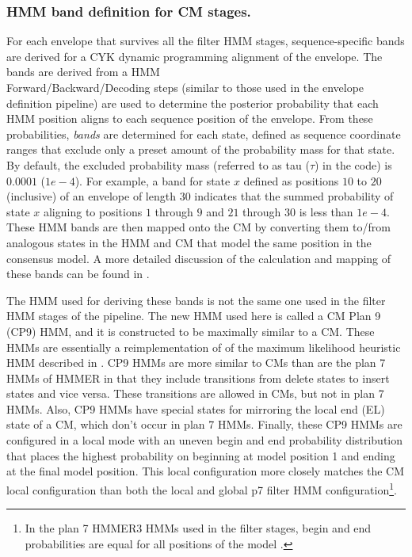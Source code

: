 \subsubsection{HMM band definition for CM stages.}

For each envelope that survives all the filter HMM stages,
sequence-specific bands are derived for a CYK dynamic programming
alignment of the envelope. The bands are derived from a HMM \\
Forward/Backward/Decoding steps (similar to those used in the envelope
definition pipeline) are used to determine the posterior probability
that each HMM position aligns to each sequence position of the
envelope. From these probabilities, \emph{bands} are determined for
each state, defined as sequence coordinate ranges that exclude only a
preset amount of the probability mass for that state. By default, the
excluded probability mass (referred to as tau ($\tau$) in the code) is
$0.0001$ ($1e-4$). For example, a band for state $x$ defined as
positions $10$ to $20$ (inclusive) of an envelope of length $30$
indicates that the summed probability of state $x$ aligning to
positions $1$ through $9$ and $21$ through $30$ is less than
$1e-4$. These HMM bands are then mapped onto the CM by converting them
to/from analogous states in the HMM and CM that model the same
position in the consensus model. A more detailed discussion of the
calculation and mapping of these bands can be found in
\citep{Nawrocki09b}.

The HMM used for deriving these bands is not the same one used in the
filter HMM stages of the pipeline. The new HMM used here is called a
CM Plan 9 (CP9) HMM, and it is constructed to be maximally similar to
a CM. These HMMs are essentially a reimplementation of of the maximum
likelihood heuristic HMM described in \citep{WeinbergRuzzo06}. 
CP9 HMMs are more similar to CMs than are the plan 7 HMMs of HMMER in
that they include transitions from delete states to insert states and
vice versa. These transitions are allowed in CMs, but not in plan 7
HMMs. Also, CP9 HMMs have special states for mirroring the local end
(EL) state of a CM, which don't occur in plan 7 HMMs.  Finally, these
CP9 HMMs are configured in a local mode with an uneven begin and end
probability distribution that places the highest probability on
beginning at model position 1 and ending at the final model position.
This local configuration more closely matches the CM local
configuration than both the local and global p7 filter HMM
configuration\footnote{In the plan 7 HMMER3 HMMs used in the filter
  stages, begin and end probabilities are equal for all positions of
  the model \citep{Eddy08}.}.

